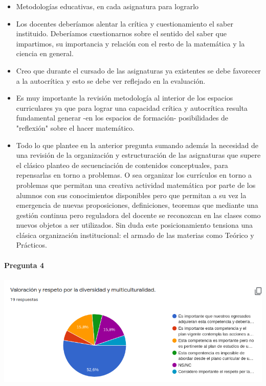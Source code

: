 \documentclass[a4paper,10pt,BCOR10mm,oneside,headsepline]{scrbook}
\begin{document}
\begin{subappendices}
\begin{itemize}
\item Metodologías educativas, en cada asignatura para lograrlo

\item Los docentes deberíamos alentar la crítica y cuestionamiento el saber instituido. Deberíamos cuestionarnos sobre  el sentido del saber que impartimos, su importancia y relación con el resto de la matemática y la ciencia en general.

\item Creo que durante el cursado  de las asignaturas ya existentes se debe favorecer a la autocrítica y esto se debe ver reflejado en la evaluación.

\item Es muy importante la revisión metodología al interior de los espacios curriculares ya que para lograr una capacidad crítica y autocrítica resulta fundamental generar -en los espacios de formación- posibilidades de "reflexión" sobre el hacer matemático.

\item Todo lo que plantee en la anterior pregunta sumando además la necesidad de una revisión de la organización y estructuración de las asignaturas que supere el clásico planteo de secuenciación de contenidos conceptuales, para repensarlas en torno a problemas. O sea organizar los currículos en torno a problemas que permitan una creativa actividad matemática por parte de los alumnos con sus conocimientos disponibles pero que permitan a su vez la emergencia de nuevas proposiciones, definiciones, teoremas que mediante una gestión continua pero reguladora del docente se reconozcan en las clases  como nuevos objetos a ser utilizados. Sin duda este posicionamiento tensiona una clásica organización institucional:   el armado de las materias como Teórico y Prácticos.

\end{itemize}

\paragraph{Pregunta 4}
\begin{center}
 
\includegraphics[scale=.9]{doc04.png}
 \end{center}


\end{subappendices}
\end{document}
